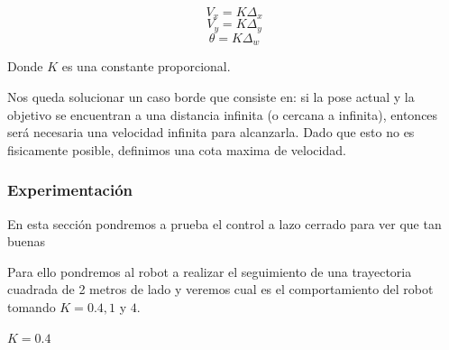 $$V_x = K \Delta_x $$
$$V_y = K \Delta_y $$
$$\theta = K \Delta_w $$

Donde $K$ es una constante proporcional.


Nos queda solucionar un caso borde que consiste en: si la pose actual y la objetivo se encuentran a una distancia infinita (o cercana a infinita), entonces será necesaria una velocidad infinita para alcanzarla. Dado que esto no es fisicamente posible, definimos una cota maxima de velocidad.


\subsubsection{Experimentación}

En esta sección pondremos a prueba el control a lazo cerrado para ver que tan buenas

Para ello pondremos al robot a realizar el seguimiento de una trayectoria cuadrada de 2 metros de lado y veremos cual es el comportamiento del robot tomando $K=0.4,1$ y $4$.

$K = 0.4$

